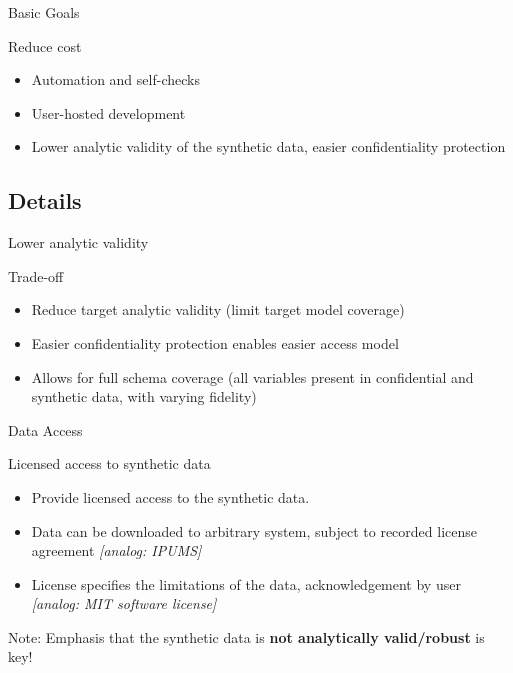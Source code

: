 \begin{frame}{Basic Goals}
\begin{block}{Reduce cost}
    \begin{itemize}
    \item Automation and self-checks
        \item User-hosted development 
        \item Lower analytic validity of the synthetic data, easier confidentiality protection
    \end{itemize}
\end{block} 
\end{frame}


\subsection{Details}


\begin{frame}{Lower analytic validity}
\begin{block}{Trade-off}
    \begin{itemize}
        \item Reduce target analytic validity (limit target model coverage)
        \item Easier confidentiality protection enables easier access model
        \item Allows for full schema coverage (all variables present in confidential and synthetic data, with varying fidelity)
    \end{itemize}
\end{block}
    
\end{frame}

\begin{frame}{Data Access}
\begin{block}{Licensed access to synthetic data}
\begin{itemize}
    \item Provide licensed access to the synthetic data.
    \item Data can be downloaded to arbitrary system, subject to recorded license agreement \textit{[analog: IPUMS]}
    \item License specifies the limitations of the data, acknowledgement by user \textit{[analog: MIT software license]}
\end{itemize}
\end{block}
Note: Emphasis that the synthetic data is \textbf{not analytically valid/robust} is key!
\end{frame}

